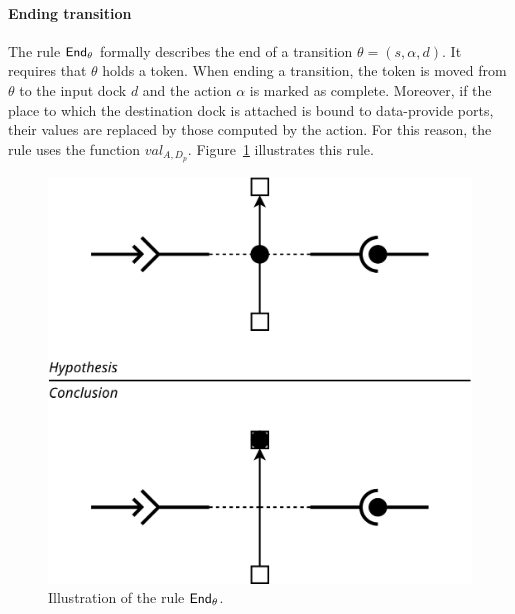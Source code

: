 \paragraph{Ending transition}{

The rule $\mathsf{End}_\theta$ formally describes the end of a transition
$\theta = (s, \alpha, d)$. It requires that $\theta$ holds a
token. When ending a transition, the token is moved from $\theta$ to
the input dock $d$ and the action $\alpha$ is marked as
complete. Moreover, if the place to which the destination dock is
attached is bound to data-provide ports, their values are replaced by
those computed by the action.  For this reason, the rule uses the
function $val_{A,D_p}$. Figure~\ref{fig:r2} illustrates this rule.

\begin{figure}[t]
\begin{center}
  \includegraphics[width=0.55\columnwidth]{./images/ending_transition.pdf}
\end{center}
\caption{Illustration of the rule $\mathsf{End}_\theta$.}
\label{fig:r2}
\end{figure}
  
}

